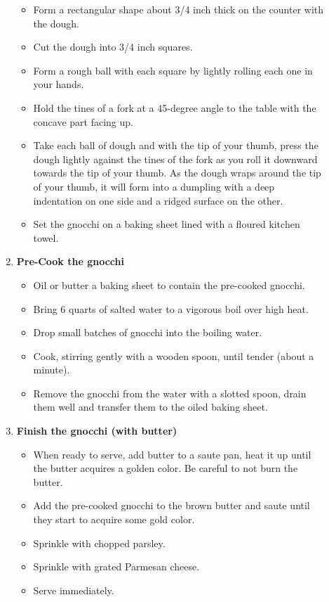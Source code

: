 \documentclass[11pt,letterpaper]{article}
\begin{document}
\begin{description}
\begin{enumerate}
	\begin{itemize}
	\item Form a rectangular shape about 3/4 inch thick on the counter with the dough.
	\item Cut the dough into 3/4 inch squares.
	\item Form a rough ball with each square by lightly rolling each one in your hands.
	\item Hold the tines of a fork at a 45-degree angle to the table with the concave part facing up.
	\item Take each ball of dough and with the tip of your thumb, press the dough lightly against the tines of the fork as you roll it downward towards the tip of your thumb. As the dough wraps around the tip of your thumb, it will form into a dumpling with a deep indentation on one side and a ridged surface on the other.
	\item Set the gnocchi on a baking sheet lined with a floured kitchen towel.
	\end{itemize}
	\item {\bf Pre-Cook the gnocchi}
	\begin{itemize}
	\item Oil or butter a baking sheet to contain the pre-cooked gnocchi.
	\item Bring 6 quarts of salted water to a vigorous boil over high heat.
	\item Drop small batches of gnocchi into the boiling water.
	\item Cook, stirring gently with a wooden spoon, until tender (about a minute).
	\item Remove the gnocchi from the water with a slotted spoon, drain them well and transfer them to the oiled baking sheet.
	\end{itemize}
	\item {\bf Finish the gnocchi (with butter)}
	\begin{itemize}
	\item When ready to serve, add butter to a saute pan, heat it up until the butter acquires a golden color. Be careful to not burn the butter.
	\item Add the pre-cooked gnocchi to the brown butter and saute until they start to acquire some gold color.
	\item Sprinkle with chopped parsley.
	\item Sprinkle with grated Parmesan cheese.
	\item Serve immediately.
	\end{itemize}

\end{enumerate}
\end{description}
\end{document}
